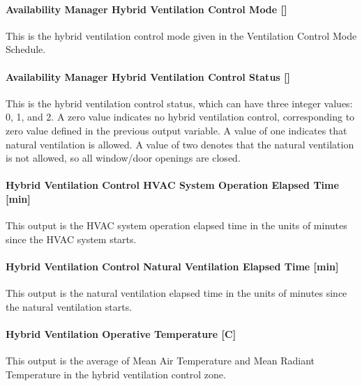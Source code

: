 \paragraph{Availability Manager Hybrid Ventilation Control Mode {[]}}\label{availability-manager-hybrid-ventilation-control-mode}

This is the hybrid ventilation control mode given in the Ventilation Control Mode Schedule.

\paragraph{Availability Manager Hybrid Ventilation Control Status {[]}}\label{availability-manager-hybrid-ventilation-control-status}

This is the hybrid ventilation control status, which can have three integer values: 0, 1, and 2. A zero value indicates no hybrid ventilation control, corresponding to zero value defined in the previous output variable. A value of one indicates that natural ventilation is allowed. A value of two denotes that the natural ventilation is not allowed, so all window/door openings are closed.

\paragraph{Hybrid Ventilation Control HVAC System Operation Elapsed Time {[min]}}\label{hybrid-ventilation-control-hvac-system-operation-elapsed-time}

This output is the HVAC system operation elapsed time in the units of minutes since the HVAC system starts.

\paragraph{Hybrid Ventilation Control Natural Ventilation Elapsed Time {[min]}}\label{hybrid-ventilation-control-natural-ventilation-elapsed-time}

This output is the natural ventilation elapsed time in the units of minutes since the natural ventilation starts.

\paragraph{Hybrid Ventilation Operative Temperature {[C]}}\label{hybrid-ventilation-operative-temperature}

This output is the average of Mean Air Temperature and Mean Radiant Temperature in the hybrid ventilation control zone.

